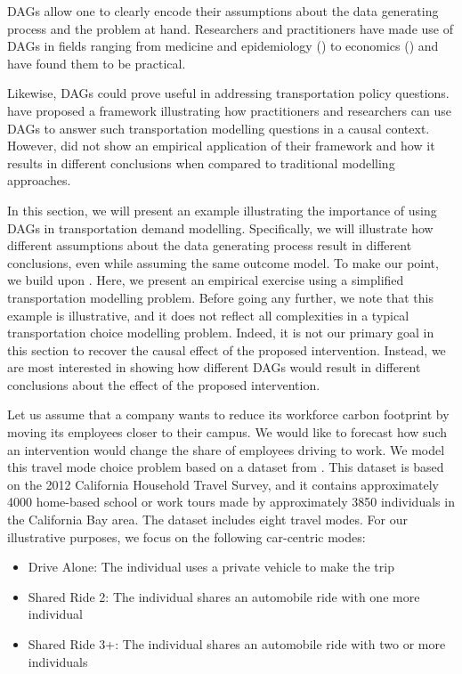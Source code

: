 DAGs allow one to clearly encode their assumptions about the data generating process and the problem at hand.
Researchers and practitioners have made use of DAGs in fields ranging from medicine and epidemiology (\citet{shrier_2008_reducing, sung_2012_reducing}) to economics (\citet{white_2011_covariate}) and have found them to be practical.

Likewise, DAGs could prove useful in addressing transportation policy questions.
\citet{brathwaite_2018_causal} have proposed a framework illustrating how practitioners and researchers can use DAGs to answer such transportation modelling questions in a causal context.
However, \citet{brathwaite_2018_causal} did not show an empirical application of their framework and how it results in different conclusions when compared to traditional modelling approaches.

In this section, we will present an example illustrating the importance of using DAGs in transportation demand modelling.
Specifically, we will illustrate how different assumptions about the data generating process result in different conclusions, even while assuming the same outcome model.
To make our point, we build upon \citet{brathwaite_2018_causal}.
Here, we present an empirical exercise using a simplified transportation modelling problem.
Before going any further, we note that this example is illustrative, and it does not reflect all complexities in a typical transportation choice modelling problem.
Indeed, it is not our primary goal in this section to recover the causal effect of the proposed intervention.
Instead, we are most interested in showing how different DAGs would result in different conclusions about the effect of the proposed intervention.

Let us assume that a company wants to reduce its workforce carbon footprint by moving its employees closer to their campus.
We would like to forecast how such an intervention would change the share of employees driving to work.
We model this travel mode choice problem based on a dataset from \citet{brathwaite_asymmetric}.
This dataset is based on the 2012 California Household Travel Survey, and it
contains approximately 4000 home-based school or work tours made by approximately 3850 individuals in the California Bay area.
The dataset includes eight travel modes. 
For our illustrative purposes, we focus on the following car-centric modes:

\begin{itemize}
   \item Drive Alone: The individual uses a private vehicle to make the trip
   \item Shared Ride 2: The individual shares an automobile ride with one more individual
   \item Shared Ride 3+: The individual shares an automobile ride with two or more individuals
\end{itemize}

